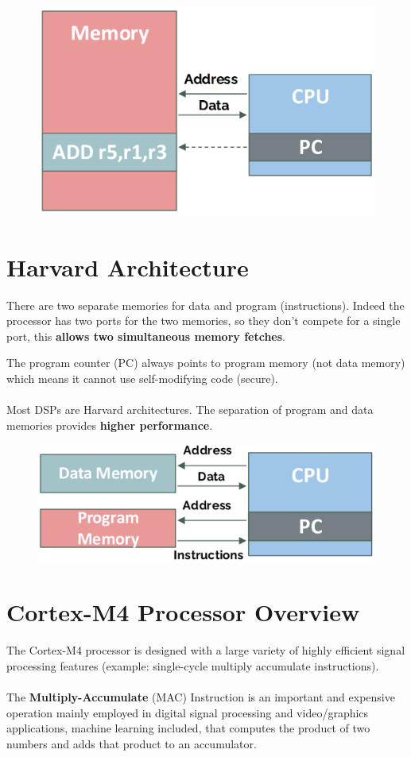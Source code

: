 \begin{figure}[H]
    \centering
    \includegraphics[width=0.4\linewidth]{img/image11.png}
\end{figure}


\section{Harvard Architecture}

There are two separate memories for data and program (instructions). Indeed the processor has two ports
for the two memories, so they don't compete for a single port, this \textbf{allows two simultaneous memory fetches}.

The program counter (PC) always points to program memory (not data memory) which means it cannot use self-modifying
code (secure).

\paragraph{}
Most DSPs are Harvard architectures. The separation of program and data memories provides \textbf{higher
performance}.


\begin{figure}[H]
    \centering
    \includegraphics[width=0.5\linewidth]{img/image12.png}
\end{figure}

\section{Cortex-M4 Processor Overview}

The Cortex-M4 processor is designed with a large variety of highly efficient signal processing features
(example: single-cycle multiply accumulate instructions).

\paragraph{}
The \textbf{Multiply-Accumulate} (MAC) Instruction is an important and expensive operation mainly employed in
digital signal processing and video/graphics applications, machine learning included, that computes the
product of two numbers and adds that product to an accumulator.

